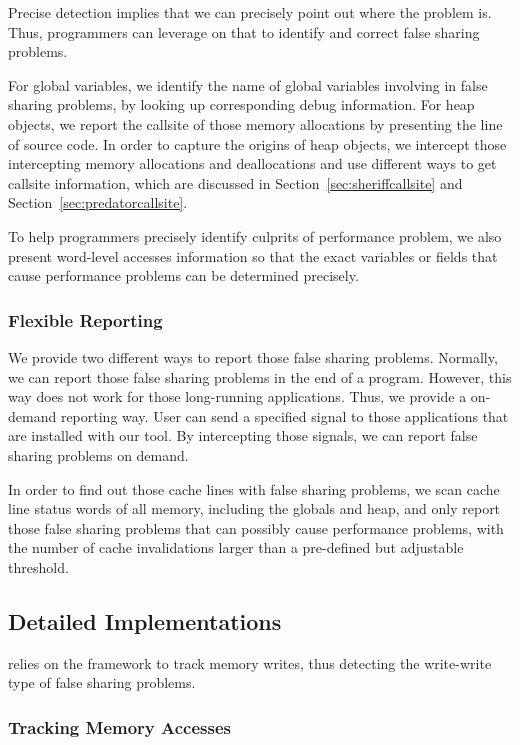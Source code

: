 Precise detection implies that we can precisely point out where the problem is. Thus, programmers can leverage on that to identify and correct false sharing problems.

For global variables, we identify the name of global variables involving in false sharing problems, by looking up corresponding debug information. For heap objects, we report the callsite of those memory allocations by presenting the line of source code. In order to capture the origins of heap objects, we intercept those intercepting memory allocations and deallocations and use different ways to get callsite information, which are discussed in Section~\ref{sec:sheriffcallsite} and Section~\ref{sec:predatorcallsite}.

To help programmers precisely identify culprits of performance problem, we also present word-level accesses information so that the exact variables or fields that cause performance problems can be determined precisely. 

\subsubsection{Flexible Reporting}
\label{sec:flexiblereport}

We provide two different ways to report those false sharing problems. Normally, we can report those false sharing problems in the end of a program. However, this way does not work for those long-running applications. Thus, we provide a on-demand reporting way. User can send a specified signal to those applications that are installed with our tool. By intercepting those signals, we can report false sharing problems on demand.

In order to find out those cache lines with false sharing problems, we scan cache line status words of all memory, including the globals and heap, and only report those false sharing problems that can possibly cause performance problems, with the number of cache invalidations larger than a pre-defined but adjustable threshold.

\subsection{Detailed Implementations}

\label{sec:sheriffdetect}
\SheriffDetect{} relies on the \sheriff{} framework to track memory writes, thus detecting the write-write type of false sharing problems.  

\subsubsection{Tracking Memory Accesses}
\label{sec:memoryaccesses}

